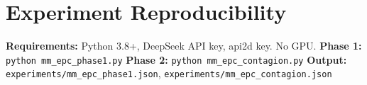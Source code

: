 \documentclass[11pt,a4paper]{article}
\begin{document}
\appendix
\section{Experiment Reproducibility}
\textbf{Requirements:} Python 3.8+, DeepSeek API key, api2d key. No GPU.
\textbf{Phase 1:} \texttt{python mm\_epc\_phase1.py}
\textbf{Phase 2:} \texttt{python mm\_epc\_contagion.py}
\textbf{Output:} \texttt{experiments/mm\_epc\_phase1.json}, \texttt{experiments/mm\_epc\_contagion.json}
\end{document}
